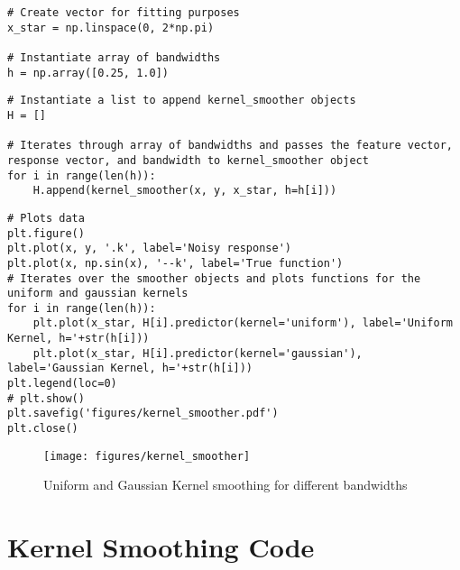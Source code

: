 \documentclass[10pt]{article}
\begin{document}
\begin{enumerate}[label=(\Alph*)]
\begin{lstlisting}
# Create vector for fitting purposes
x_star = np.linspace(0, 2*np.pi)

# Instantiate array of bandwidths
h = np.array([0.25, 1.0])
        \end{lstlisting}

        \begin{lstlisting}
# Instantiate a list to append kernel_smoother objects
H = []

# Iterates through array of bandwidths and passes the feature vector, response vector, and bandwidth to kernel_smoother object
for i in range(len(h)):
    H.append(kernel_smoother(x, y, x_star, h=h[i]))
        \end{lstlisting}

        \begin{lstlisting}
# Plots data 
plt.figure()
plt.plot(x, y, '.k', label='Noisy response')
plt.plot(x, np.sin(x), '--k', label='True function')
# Iterates over the smoother objects and plots functions for the uniform and gaussian kernels
for i in range(len(h)):
    plt.plot(x_star, H[i].predictor(kernel='uniform'), label='Uniform Kernel, h='+str(h[i]))
    plt.plot(x_star, H[i].predictor(kernel='gaussian'), label='Gaussian Kernel, h='+str(h[i]))
plt.legend(loc=0)
# plt.show()
plt.savefig('figures/kernel_smoother.pdf')
plt.close()
        \end{lstlisting}

        \begin{figure}[ht] 
          \centering 
          \texttt{[image: figures/kernel\_smoother]}
          \caption{\label{fig:kernel_smoother}Uniform and Gaussian Kernel smoothing for different bandwidths}
        \end{figure}

    \end{enumerate}

    \clearpage
    \appendix
    \section{Kernel Smoothing Code}
\end{document}
